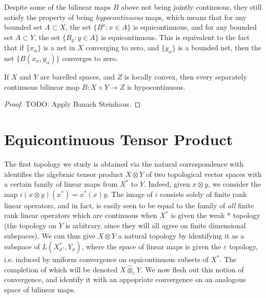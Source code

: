 Despite some of the bilinear maps $B$ above not being jointly continuous, they still satisfy the property of being \emph{hypocontinuous} maps, which means that for any bounded set $A \subset X$, the set $\{ B^x: x \in A \}$ is equicontinuous, and for any bounded set $A \subset Y$, the set $\{ B_y : y \in A \}$ is equicontinuous. This is equivalent to the fact that if $\{ x_\alpha \}$ is a net in $X$ converging to zero, and $\{ y_\alpha \}$ is a bounded net, then the net $\{ B(x_\alpha,y_\alpha) \}$ converges to zero.

\begin{theorem}
    If $X$ and $Y$ are barelled spaces, and $Z$ is locally convex, then every separately continuous bilinear map $B: X \times Y \to Z$ is hypocontinuous.
\end{theorem}
\begin{proof}
    TODO: Apply Banach Steinhaus.
\end{proof}

\section{Equicontinuous Tensor Product}

The first topology we study is obtained via the natural correspondence with identifies the algebraic tensor product $X \otimes Y$ of two topological vector spaces with a certain family of linear maps from $X^*$ to $Y$. Indeed, given $x \otimes y$, we consider the map $i(x \otimes y)(x^*) = x^*(x) y$. The image of $i$ consists solely of finite rank linear operators, and in fact, is easily seen to be equal to the family of \emph{all} finite rank linear operators which are continuous when $X^*$ is given the weak $*$ topology (the topology on $Y$ is arbitrary, since they will all agree on finite dimensional subspaces). We can thus give $X \otimes Y$ a natural topology by identifying it as a subspace of $L(X^*_{\sigma^*}, Y_\sigma)$, where the space of linear maps is given the $\varepsilon$ topology, i.e. induced by uniform convergence on equicontinuous subsets of $X^*$. The completion of which will be denoted $X \widehat{\otimes}_\varepsilon Y$. We now flesh out this notion of convergence, and identify it with an appopriate convergence on an analogous space of bilinear maps.

